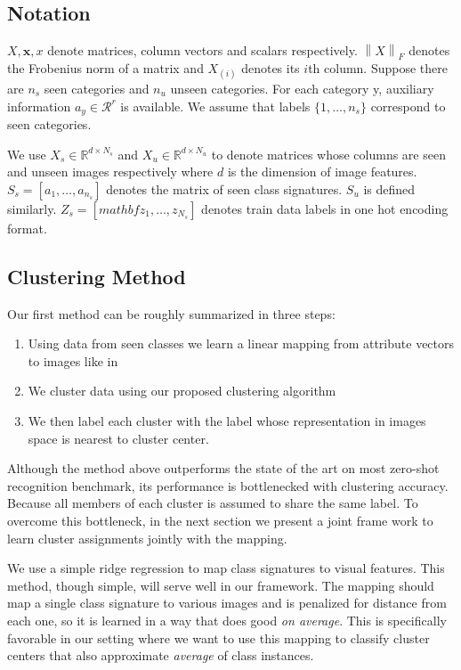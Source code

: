 \documentclass[10pt,twocolumn,letterpaper]{article}
\newcommand{\norm}[1]{\left \lVert #1 \right \rVert_{F}}
\begin{document}
\subsection{Notation}
$X, \mathbf{x}, x$ denote matrices, column vectors and scalars respectively. $\norm{X}$ denotes the Frobenius norm of a matrix and
$X_{(i)}$ denotes its $i$th column.
Suppose there are $n_s$ seen categories and $n_u$ unseen categories. For each category y,
auxiliary information $a_y \in \mathcal{R}^r$ is available. We assume that labels $\{1, \ldots, n_s \}$
correspond to seen categories.

We use $X_s \in \mathbb{R}^{d \times N_s}$ and $X_u \in \mathbb{R}^{d \times N_u}$
to denote matrices whose columns are seen and unseen images respectively where $d$ is the dimension of image features.
$S_s = [a_1, \ldots, a_{n_s}]$ denotes the matrix of seen class signatures. $S_u$ is defined similarly.
$Z_s = [ mathbf{z_1, \ldots, z_{N_s}} ]$
denotes train data labels in one hot encoding format.

\subsection{Clustering Method}
Our first method can be roughly summarized in three steps:
\begin{enumerate}
  \item Using data from seen classes we learn a linear mapping from  attribute vectors to images like in \cite{Kodirov2015}
  \item We cluster data using our proposed clustering algorithm
  \item We then label each cluster with the label whose representation in images space is nearest to cluster center.
\end{enumerate}
 Although the method above outperforms the state of the art on most zero-shot recognition benchmark,
its performance is bottlenecked with clustering accuracy. Because all members of each cluster is assumed to
share the same label. To overcome this bottleneck, in the next section we
present a joint frame work to learn cluster assignments jointly with the mapping.

We use a simple ridge regression to map class signatures to visual features. This method, though simple,
will serve well in our framework. The mapping should map a single class signature to various images and is penalized
for distance from each one, so it is learned in a way that does good \textit{on average}. This is specifically
favorable in our setting where we want to use this mapping to classify cluster centers that also
approximate \textit{average} of class instances.
\end{document}
